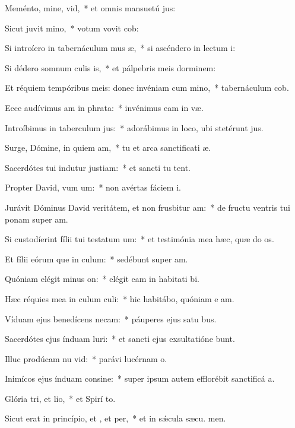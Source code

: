 \item Meménto, mine, vid,~* et omnis mansuetú jus:
\item Sicut juvit mino,~* votum vovit  cob:
\item Si introíero in tabernáculum mus æ,~* si ascéndero in lectum  i:
\item Si dédero somnum culis is,~* et pálpebris meis dorminem:
\item Et réquiem tempóribus meis: donec invéniam cum mino,~* tabernáculum  cob.
\item Ecce audívimus am in phrata:~* invénimus eam in  væ.
\item Introíbimus in taberculum jus:~* adorábimus in loco, ubi stetérunt  jus.
\item Surge, Dómine, in quiem am,~* tu et arca sanctificati æ.
\item Sacerdótes tui indutur justiam:~* et sancti tu tent.
\item Propter David, vum um:~* non avértas fáciem  i.
\item Jurávit Dóminus David veritátem, et non frusbitur am:~* de fructu ventris tui ponam super  am.
\item Si custodíerint fílii tui testatum um:~* et testimónia mea hæc, quæ do os.
\item Et fílii eórum que in culum:~* sedébunt super  am.
\item Quóniam elégit minus on:~* elégit eam in habitati bi.
\item Hæc réquies mea in culum culi:~* hic habitábo, quóniam e am.
\item Víduam ejus benedícens necam:~* páuperes ejus satu bus.
\item Sacerdótes ejus índuam luri:~* et sancti ejus exsultatióne bunt.
\item Illuc prodúcam nu vid:~* parávi lucérnam  o.
\item Inimícos ejus índuam consine:~* super ipsum autem efflorébit sanctificá a.
\item Glória tri, et lio,~* et Spirí to.
\item Sicut erat in princípio, et , et per,~* et in sǽcula sæcu. men.
